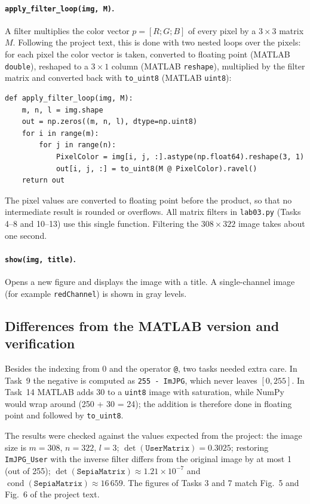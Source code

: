 \paragraph{\texttt{apply\_filter\_loop(img, M)}.}
A filter multiplies the color vector $p=[R;G;B]$ of every pixel by a
$3\times3$ matrix $M$. Following the project text, this is done with two
nested loops over the pixels: for each pixel the color vector is taken,
converted to floating point (MATLAB \texttt{double}), reshaped to a
$3\times1$ column (MATLAB \texttt{reshape}), multiplied by the filter matrix
and converted back with \texttt{to\_uint8} (MATLAB \texttt{uint8}):
\begin{lstlisting}
def apply_filter_loop(img, M):
    m, n, l = img.shape
    out = np.zeros((m, n, l), dtype=np.uint8)
    for i in range(m):
        for j in range(n):
            PixelColor = img[i, j, :].astype(np.float64).reshape(3, 1)
            out[i, j, :] = to_uint8(M @ PixelColor).ravel()
    return out
\end{lstlisting}
The pixel values are converted to floating point before the product, so that
no intermediate result is rounded or overflows. All matrix filters in
\texttt{lab03.py} (Tasks 4--8 and 10--13) use this single function. Filtering
the $308\times322$ image takes about one second.

\paragraph{\texttt{show(img, title)}.}
Opens a new figure and displays the image with a title. A single-channel image
(for example \texttt{redChannel}) is shown in gray levels.

\subsection{Differences from the MATLAB version and verification}
Besides the indexing from 0 and the operator \texttt{@}, two tasks needed extra
care. In Task~9 the negative is computed as \texttt{255 - ImJPG}, which never
leaves $[0,255]$. In Task~14 MATLAB adds 30 to a \texttt{uint8} image with
saturation, while NumPy would wrap around (250 + 30 = 24); the addition is
therefore done in floating point and followed by \texttt{to\_uint8}.

The results were checked against the values expected from the project:
the image size is $m=308$, $n=322$, $l=3$; $\det(\texttt{UserMatrix}) = 0.3025$;
restoring \texttt{ImJPG\_User} with the inverse filter differs from the
original image by at most 1 (out of 255); $\det(\texttt{SepiaMatrix})\approx 1.21\times10^{-7}$
and $\operatorname{cond}(\texttt{SepiaMatrix})\approx 16\,659$. The figures of
Tasks 3 and 7 match Fig.~5 and Fig.~6 of the project text.

